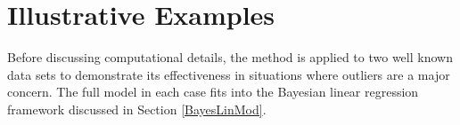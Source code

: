 \documentclass[ba]{imsart}
\newcommand{\iid}{\stackrel{iid}{\sim}}
\begin{document}






\section{Illustrative Examples}
\label{illustrations}
Before discussing computational details, the method is applied to two well known data sets to demonstrate its effectiveness in situations where outliers are a major concern. The full model in each case fits into the Bayesian linear regression framework discussed in Section \ref{BayesLinMod}. %
\end{document}
